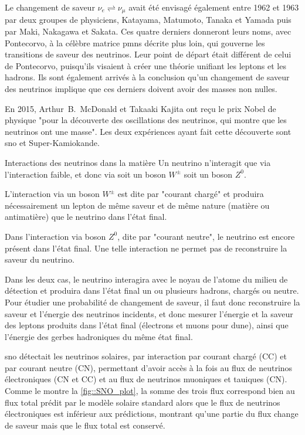       Le changement de saveur $\nu_e\rightleftharpoons\nu_{\mu}$ avait été envisagé également entre 1962 et 1963 par deux groupes de physiciens, Katayama, Matumoto, Tanaka et Yamada\cite{Nakagawa1963} puis par Maki,  Nakagawa et  Sakata\cite{Maki1962}. Ces quatre derniers donneront leurs noms, avec Pontecorvo, à la célèbre matrice \gls{pmns} décrite plus loin, qui gouverne les transitions de saveur des neutrinos. Leur point de départ était différent de celui de Pontecorvo, puisqu'ils visaient à créer une théorie unifiant les leptons et les hadrons. Ils sont également arrivés à la conclusion qu'un changement de saveur des neutrinos implique que ces derniers doivent avoir des masses non nulles.

      En 2015, Arthur~B.~McDonald et Takaaki Kajita ont reçu le prix Nobel de physique "pour la découverte des oscillations des neutrinos, qui montre que les neutrinos ont une masse". Les deux expériences ayant fait cette découverte sont \gls{sno}\cite{Aharmim2013} et Super-Kamiokande\cite{Fukuda1998}.

    \begin{activitybox}[label=box::courants]{Interactions des neutrinos dans la matière}
      Un neutrino n'interagit que via l'interaction faible, et donc via soit un boson $W^{\pm}$ soit un boson $Z^0$. 

      L'interaction via un boson $W^{\pm}$ est dite par "courant chargé" et produira nécessairement un lepton de même saveur et de même nature (matière ou antimatière) que le neutrino dans l'état final.
      
      Dans l'interaction via boson $Z^0$, dite par "courant neutre", le neutrino est encore présent dans l'état final. Une telle interaction ne permet pas de reconstruire la saveur du neutrino.

      Dans les deux cas, le neutrino interagira avec le noyau de l'atome du milieu de détection et produira dans l'état final un ou plusieurs hadrons, chargés ou neutre. Pour étudier une probabilité de changement de saveur, il faut donc reconstruire la saveur et l'énergie des neutrinos incidents, et donc mesurer l'énergie et la saveur des leptons produits dans l'état final (électrons et muons pour \gls{dune}), ainsi que l'énergie des gerbes hadroniques du même état final.
    \end{activitybox}

      \gls{sno} détectait les neutrinos solaires, par interaction par courant chargé (CC) et par courant neutre (CN), permettant d'avoir accès à la fois au flux de neutrinos électroniques (CN et CC) et au flux de neutrinos muoniques et tauiques (CN). Comme le montre la \autoref{fig::SNO_plot}, la somme des trois flux correspond bien au flux total prédit par le modèle solaire standard alors que le flux de neutrinos électroniques est inférieur aux prédictions, montrant qu'une partie du flux change de saveur mais que le flux total est conservé.

